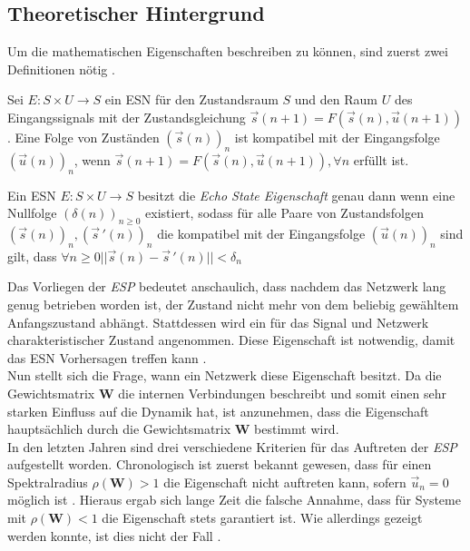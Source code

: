 \subsection{Theoretischer Hintergrund}
\label{sc:esn_theory}
Um die mathematischen Eigenschaften beschreiben zu können, sind zuerst zwei Definitionen nötig \cite{yildiz}.

\begin{definition}
Sei $E : S \times U \rightarrow S$ ein \textsc{ESN} für den Zustandsraum $S$ und den Raum $U$ des Eingangssignals mit der Zustandsgleichung $\vec{s}(n+1) = F \left( \vec{s}(n), \vec{u}(n+1) \right)$. Eine Folge von Zuständen $(\vec{s}(n))_n$ ist kompatibel mit der Eingangsfolge $(\vec{u}(n))_n$, wenn $\vec{s}(n+1) = F\left( \vec{s}(n), \vec{u}(n+1) \right), \forall n$ erfüllt ist.
\end{definition}

\begin{definition}
Ein \textsc{ESN} $E : S \times U \rightarrow S$ besitzt die \textit{Echo State Eigenschaft} genau dann wenn eine Nullfolge $(\delta(n))_{n \geq 0}$ existiert, sodass für alle Paare von Zustandsfolgen $(\vec{s}(n))_n, (\vec{s}\,'(n))_n$ die kompatibel mit der Eingangsfolge $(\vec{u}(n))_n$ sind gilt, dass $\forall n \geq 0 ||\vec{s}(n) - \vec{s}\,'(n)|| < \delta_n$
\end{definition} 
Das Vorliegen der \textit{ESP} bedeutet anschaulich, dass nachdem das Netzwerk lang genug betrieben worden ist, der Zustand nicht mehr von dem beliebig gewähltem Anfangszustand abhängt. Stattdessen wird ein für das Signal und Netzwerk charakteristischer Zustand angenommen. Diese Eigenschaft ist notwendig, damit das \textsc{ESN} Vorhersagen treffen kann \cite{jeagerTut2002}.\\

Nun stellt sich die Frage, wann ein Netzwerk diese Eigenschaft besitzt. Da die Gewichtsmatrix $\mathbf{W}$ die internen Verbindungen beschreibt und somit einen sehr starken Einfluss auf die Dynamik hat, ist anzunehmen, dass die Eigenschaft hauptsächlich durch die Gewichtsmatrix $\mathbf{W}$ bestimmt wird.\\

In den letzten Jahren sind drei verschiedene Kriterien für das Auftreten der \textit{ESP} aufgestellt worden. Chronologisch ist zuerst bekannt gewesen, dass für einen Spektralradius $\rho(\mathbf{W}) > 1$ die Eigenschaft nicht auftreten kann, sofern $\vec{u}_n = 0$ möglich ist \cite{jaeger2007, jaeger2010}. Hieraus ergab sich lange Zeit die falsche Annahme, dass für Systeme mit $\rho(\mathbf{W}) < 1$ die Eigenschaft stets garantiert ist. Wie allerdings gezeigt werden konnte, ist dies nicht der Fall \citep{yildiz}.\\

